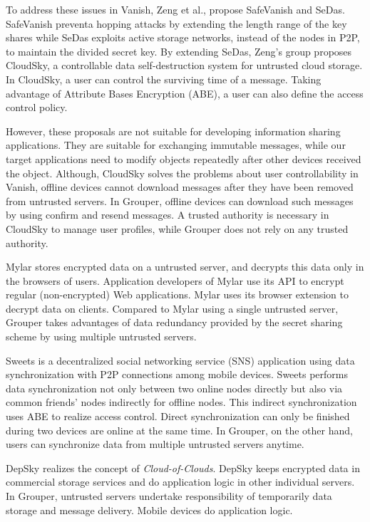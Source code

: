 \documentclass[twocolumn,10pt]{article}
\begin{document}
To address these issues in Vanish, Zeng et al., propose SafeVanish\cite{zeng2010safevanish} and SeDas\cite{zeng2012sedas}. 
SafeVanish preventa hopping attacks by extending the length range of the key shares while SeDas exploits active storage networks, instead of the nodes in P2P, to maintain the divided secret key. By extending SeDas, Zeng's group proposes CloudSky\cite{zeng2015cloudsky}, a controllable data self-destruction system for untrusted cloud storage. 
In CloudSky, a user can control the surviving time of a message.
Taking advantage of Attribute Bases Encryption (ABE), a user can also define the access control policy.

However, these proposals are not suitable for developing information sharing applications. 
They are suitable for exchanging immutable messages, while our target applications need to modify objects repeatedly after other devices received the object. 
Although, CloudSky solves the problems about user controllability in Vanish, offline devices cannot download messages after they have been removed from untrusted servers.
In Grouper, offline devices can download such messages by using confirm and resend messages.
A trusted authority is necessary in CloudSky to manage user profiles, while Grouper does not rely on any trusted authority.

Mylar\cite{popa2014building} stores encrypted data on a untrusted server, and decrypts this data only in the browsers of users. 
Application developers of Mylar use its API to encrypt regular (non-encrypted) Web applications. 
Mylar uses its browser extension to decrypt data on clients. 
Compared to Mylar using a single untrusted server, Grouper takes advantages of data redundancy provided by the secret sharing scheme by using multiple untrusted servers.

Sweets\cite{sweets} is a decentralized social networking service (SNS) application using data synchronization with P2P connections among mobile devices. 
Sweets performs data synchronization not only between two online nodes directly but also via common friends' nodes indirectly for offline nodes.
This indirect synchronization uses ABE to realize access control.
Direct synchronization can only be finished during two devices are online at the same time. 
In Grouper, on the other hand, users can synchronize data from multiple untrusted servers anytime.

DepSky\cite{bessani2013depsky} realizes the concept of \emph{Cloud-of-Clouds}.  
DepSky keeps encrypted data in commercial storage services and do application logic in other individual servers.
In Grouper, untrusted servers undertake responsibility of temporarily data storage and message delivery.
Mobile devices do application logic.
\end{document}
